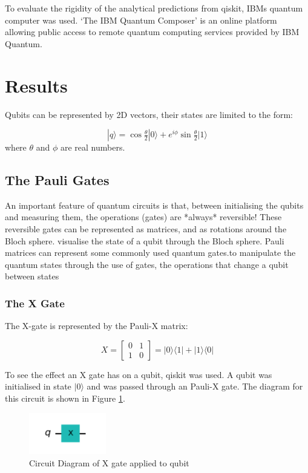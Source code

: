 To evaluate the rigidity of the analytical predictions from qiskit, IBMs quantum computer was used. `The IBM Quantum Composer' is an online platform allowing public access to remote quantum computing services provided by IBM Quantum.


\section{Results}
Qubits can be represented by 2D vectors, their states are limited to the form:

$$ |q\rangle = \cos{\tfrac{\theta}{2}}|0\rangle + e^{i\phi}\sin{\tfrac{\theta}{2}}|1\rangle $$
where $\theta$ and $\phi$ are real numbers. 

\subsection{The Pauli Gates}
An important feature of quantum circuits is that, between initialising the qubits and measuring them, the operations (gates) are *always* reversible! These reversible gates can be represented as matrices, and as rotations around the Bloch sphere. visualise the state of a qubit through the Bloch sphere.
Pauli matrices can represent some commonly used quantum gates.to manipulate the quantum states through the use of gates, the operations that change a qubit between states

\subsubsection{The X Gate}
The X-gate is represented by the Pauli-X matrix:

$$ X = \begin{bmatrix} 0 & 1 \\ 1 & 0 \end{bmatrix} = |0\rangle\langle1| + |1\rangle\langle0| $$

To see the effect an X gate has on a qubit, qiskit was used. A qubit was initialised in state $|0\rangle$ and was passed through an Pauli-X gate. The diagram for this circuit is shown in Figure \ref{fig:xGate}.

\begin{figure}[h]
    \centering
    \includegraphics[width=0.3\textwidth]{lab2/xGate.png}
    \caption{Circuit Diagram of X gate applied to qubit} 
    \label{fig:xGate}
\end{figure}

